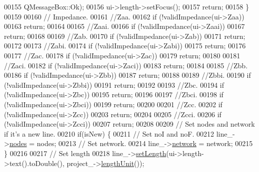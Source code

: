 \begin{DoxyCode}
00155                              QMessageBox::Ok);
00156     ui->length->setFocus();
00157     \textcolor{keywordflow}{return};
00158   \}
00159 
00160   \textcolor{comment}{// Impedance.}
00161   \textcolor{comment}{//Zaa.}
00162   \textcolor{keywordflow}{if} (!validImpedance(ui->Zaa))
00163     \textcolor{keywordflow}{return};
00164 
00165   \textcolor{comment}{//Zaai.}
00166   \textcolor{keywordflow}{if} (!validImpedance(ui->Zaai))
00167     \textcolor{keywordflow}{return};
00168 
00169   \textcolor{comment}{//Zab.}
00170   \textcolor{keywordflow}{if} (!validImpedance(ui->Zab))
00171     \textcolor{keywordflow}{return};
00172 
00173   \textcolor{comment}{//Zabi.}
00174   \textcolor{keywordflow}{if} (!validImpedance(ui->Zabi))
00175     \textcolor{keywordflow}{return};
00176 
00177   \textcolor{comment}{//Zac.}
00178   \textcolor{keywordflow}{if} (!validImpedance(ui->Zac))
00179     \textcolor{keywordflow}{return};
00180 
00181   \textcolor{comment}{//Zaci.}
00182   \textcolor{keywordflow}{if} (!validImpedance(ui->Zaci))
00183     \textcolor{keywordflow}{return};
00184 
00185   \textcolor{comment}{//Zbb.}
00186   \textcolor{keywordflow}{if} (!validImpedance(ui->Zbb))
00187     \textcolor{keywordflow}{return};
00188 
00189   \textcolor{comment}{//Zbbi.}
00190   \textcolor{keywordflow}{if} (!validImpedance(ui->Zbbi))
00191     \textcolor{keywordflow}{return};
00192 
00193   \textcolor{comment}{//Zbc.}
00194   \textcolor{keywordflow}{if} (!validImpedance(ui->Zbc))
00195     \textcolor{keywordflow}{return};
00196 
00197   \textcolor{comment}{//Zbci.}
00198   \textcolor{keywordflow}{if} (!validImpedance(ui->Zbci))
00199     \textcolor{keywordflow}{return};
00200 
00201   \textcolor{comment}{//Zcc.}
00202   \textcolor{keywordflow}{if} (!validImpedance(ui->Zcc))
00203     \textcolor{keywordflow}{return};
00204 
00205   \textcolor{comment}{//Zcci.}
00206   \textcolor{keywordflow}{if} (!validImpedance(ui->Zcci))
00207     \textcolor{keywordflow}{return};
00208 
00209   \textcolor{comment}{// Set nodes and network if it's a new line.}
00210   \textcolor{keywordflow}{if}(isNew) \{
00211     \textcolor{comment}{// Set noI and noF.}
00212     line\_->\hyperlink{class_line_afd17c40d656e6a8d677cb22df5f0c70b}{nodes} = nodes;
00213     \textcolor{comment}{// Set network.}
00214     line\_->\hyperlink{class_line_aefdf6a6c3e3775b5a16b344c1d33964e}{network} = network;
00215   \}
00216 
00217   \textcolor{comment}{// Set length}
00218   line\_->\hyperlink{group___models_ga950d0b8f5d167eda430c65ca7adadbb0}{setLength}(ui->length->text().toDouble(), project\_->\hyperlink{class_project_a40cd2f59a4a708897e5997942c046f4d}{lengthUnit}());

\end{DoxyCode}
